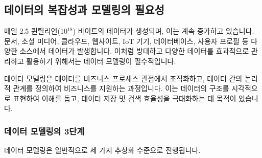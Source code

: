 \documentclass[11pt,a4paper]{article}
\theoremstyle{definition}
\begin{document}
\subsection{데이터의 복잡성과 모델링의 필요성}

매일 2.5 퀸틸리언(10$^{18}$) 바이트의 데이터가 생성되며, 이는 계속 증가하고 있습니다. 문서, 소셜 미디어, 클라우드, 웹사이트, IoT 기기, 데이터베이스, 사용자 프로필 등 다양한 소스에서 데이터가 발생합니다. 이처럼 방대하고 다양한 데이터를 효과적으로 관리하고 활용하기 위해서는 데이터 모델링이 필수적입니다.

\begin{tcolorbox}[definition, title=데이터 모델링이란?]
데이터 모델링은 데이터를 비즈니스 프로세스 관점에서 조직화하고, 데이터 간의 논리적 관계를 정의하여 비즈니스를 지원하는 과정입니다. 이는 데이터의 구조를 시각적으로 표현하여 이해를 돕고, 데이터 저장 및 검색 효율성을 극대화하는 데 목적이 있습니다.
\end{tcolorbox}

\subsubsection{데이터 모델링의 3단계}
데이터 모델링은 일반적으로 세 가지 추상화 수준으로 진행됩니다.
\end{document}
